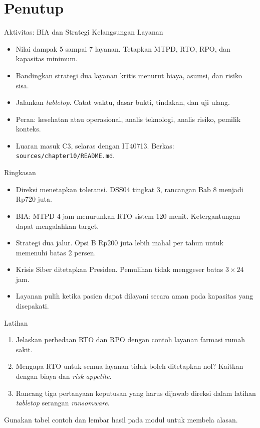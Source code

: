 \documentclass[aspectratio=169, table, 12pt]{beamer}
\begin{document}
\section{Penutup}

\begin{frame}{{\Large Aktivitas: BIA dan Strategi Kelangsungan Layanan}}
  \vspace{4pt}
  \small
  \begin{itemize}
    \item Nilai dampak 5 sampai 7 layanan. Tetapkan MTPD, RTO, RPO, dan kapasitas minimum.
    \item Bandingkan strategi dua layanan kritis menurut biaya, asumsi, dan risiko sisa.
    \item Jalankan \textit{tabletop}. Catat waktu, dasar bukti, tindakan, dan uji ulang.
    \item Peran: kesehatan atau operasional, analis teknologi, analis risiko, pemilik konteks.
    \item Luaran masuk C3, selaras dengan IT40713. Berkas: \texttt{sources/chapter10/README.md}.
  \end{itemize}
\end{frame}

\begin{frame}{{\Large Ringkasan}}
  \vspace{4pt}
  \small
  \begin{itemize}
    \item Direksi menetapkan toleransi. DSS04 tingkat 3, rancangan Bab 8 menjadi Rp720 juta.
    \item BIA: MTPD 4 jam menurunkan RTO sistem 120 menit. Ketergantungan dapat mengalahkan target.
    \item Strategi dua jalur. Opsi B Rp200 juta lebih mahal per tahun untuk memenuhi batas 2 persen.
    \item Krisis Siber ditetapkan Presiden. Pemulihan tidak menggeser batas $3 \times 24$ jam.
    \item Layanan pulih ketika pasien dapat dilayani secara aman pada kapasitas yang disepakati.
  \end{itemize}
\end{frame}

\begin{frame}{{\Large Latihan}}
  \vspace{4pt}
  \small
  \begin{enumerate}
    \item Jelaskan perbedaan RTO dan RPO dengan contoh layanan farmasi rumah sakit.
    \item Mengapa RTO untuk semua layanan tidak boleh ditetapkan nol? Kaitkan dengan biaya dan
          \textit{risk appetite}.
    \item Rancang tiga pertanyaan keputusan yang harus dijawab direksi dalam latihan
          \textit{tabletop} serangan \textit{ransomware}.
  \end{enumerate}
  \vspace{6pt}
  Gunakan tabel contoh dan lembar hasil pada modul untuk membela alasan.
\end{frame}
\end{document}
